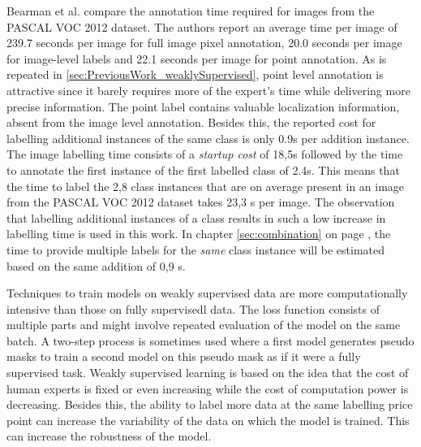 \par{
    Bearman et al.\cite{Bearman2015} compare the annotation time required for images from the PASCAL VOC 2012 dataset.
    The authors report an average time per image of 239.7 seconds per image for full image pixel annotation, 20.0 seconds per image for image-level labels and 22.1 seconds per image for point annotation.
    As is repeated in \ref{sec:PreviousWork_weaklySupervised}, point level annotation is attractive since it barely requires more of the expert's time while delivering more precise information.
    The point label contains valuable localization information, absent from the image level annotation.
    Besides this, the reported cost for labelling additional instances of the same class is only 0.9s per addition instance.
    The image labelling time consists of a \textit{startup cost} of 18,5s followed by the time to annotate the first instance of the first labelled class of 2.4s.
    This means that the time to label the 2,8 class instances that are on average present in an image from the PASCAL VOC 2012 dataset takes 23,3 s per image.
    The observation that labelling additional instances of a class results in such a low increase in labelling time is used in this work.
    In chapter \ref{sec:combination} on page \pageref{sec:combination}, the time to provide multiple labels for the \textit{same} class instance will be estimated based on the same addition of 0,9 s.
}
\\[5pt]
\par{
    Techniques to train models on weakly supervised data are more computationally intensive than those on fully \Gls{supervisedl} data.
    The loss function consists of multiple parts and might involve repeated evaluation of the model on the same batch. 
    A two-step process is sometimes used where a first model generates pseudo masks to train a second model on this pseudo mask as if it were a fully supervised task.
    Weakly supervised learning is based on the idea that the cost of human experts is fixed or even increasing while the cost of computation power is decreasing.
    Besides this, the ability to label more data at the same labelling price point can increase the variability of the data on which the model is trained. 
    This can increase the robustness of the model.
}
